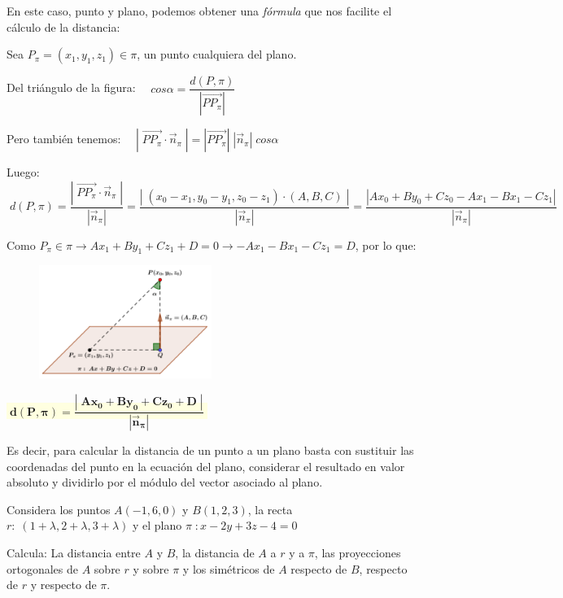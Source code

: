 En este caso, punto y plano, podemos obtener una \textit{fórmula} que nos facilite el cálculo de la distancia:



\noindent Sea $P_{\pi}=(x_1,y_1,z_1) \in \pi$, un punto cualquiera del plano.

\noindent Del triángulo de la figura:  $\quad cos \alpha=\dfrac {d(P,\pi)}{|\overrightarrow{PP_{\pi}} |}$

\noindent Pero también tenemos: $\quad |\;\overrightarrow{PP_\pi} \cdot \vec n_{\pi}\;|=|\overrightarrow{PP_\pi}|\;|\vec n_{\pi}|\;cos \alpha$


\begin{multicols}{2}

\noindent Luego: $\; d(P,\pi)=\dfrac {|\;\overrightarrow{PP_\pi} \cdot \vec n_{\pi}\;|}{|\vec n_{\pi}|}=\dfrac {|\;(x_0-x_1,y_0-y_1,z_0-z_1)\cdot (A,B,C)\;|}{|\vec n_{\pi}|} = \dfrac {|Ax_0+By_0+Cz_0-Ax_1-Bx_1-Cz_1|}{|\vec n_{\pi}|}$

\noindent Como $P_{\pi}\in\pi \to Ax_1+By_1+Cz_1+D=0 \to -Ax_1-Bx_1-Cz_1=D$, por lo que:


\begin{figure}[H]
		\centering
		\includegraphics[width=0.5\textwidth]{imagenes/imagenes11/T11IM11.png}
	\end{figure}
\end{multicols}



\centerline{\colorbox{LightYellow}{$\boxed{\;\boldsymbol{d(P,\pi)=
\dfrac {|\;Ax_0+By_0+Cz_0+D\;|}{|\vec n_{\pi}|}}\;}$}}
\justify
Es decir, para calcular la distancia de un punto a un plano basta con sustituir las coordenadas del punto en la ecuación del plano, considerar el resultado en valor absoluto y dividirlo por el módulo del vector asociado al plano.

\begin{ejem} Considera los puntos $A(-1,6,0)$ y $B(1,2,3)$, la recta $r:\; (1+\lambda, 2+\lambda, 3+\lambda)$ y el plano $\pi\;:x-2y+3z-4=0$

\noindent Calcula: La distancia entre $A$ y $B$, la distancia de $A$ a $r$ y a $\pi$, las proyecciones ortogonales de  $A$ sobre $r$ y sobre $\pi$ y los simétricos de $A$ respecto de $B$, respecto de $r$ y respecto de $\pi$.	
\end{ejem}

